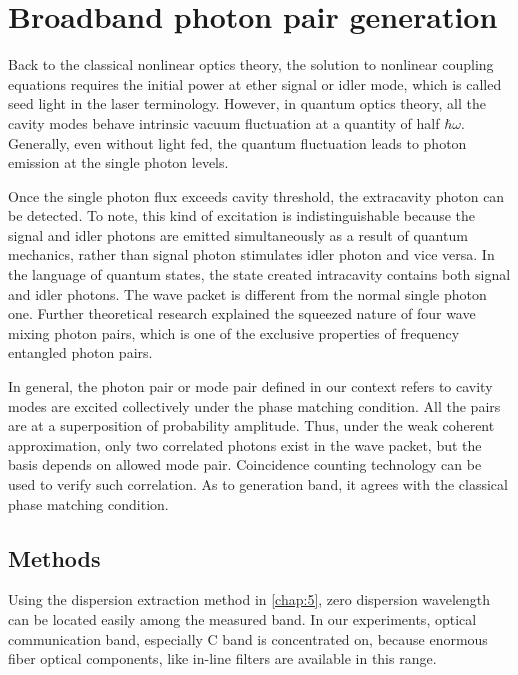 \chapter{Broadband photon pair generation}\label{chap:7}

Back to the classical nonlinear optics theory, the solution to nonlinear coupling equations requires the initial power at ether signal or idler mode, which is called seed light in the laser terminology. However, in quantum optics theory, all the cavity modes behave intrinsic vacuum fluctuation at a quantity of half $ \hbar \omega $. Generally, even without light fed, the quantum fluctuation leads to photon emission at the single photon levels. 

Once the single photon flux exceeds cavity threshold, the extracavity photon can be detected. To note, this kind of excitation is indistinguishable because the signal and idler photons are emitted simultaneously as a result of quantum mechanics, rather than signal photon stimulates idler photon and vice versa. 
In the language of quantum states, the state created intracavity contains both signal and idler photons. The wave packet is different from the normal single photon one. Further theoretical research \cite{Scully1997} explained the squeezed nature of four wave mixing photon pairs, which is one of the exclusive properties of frequency entangled photon pairs.

In general, the photon pair or mode pair defined in our context refers to cavity modes are excited collectively under the phase matching condition. 
All the pairs are at a superposition of probability amplitude.
Thus, under the weak coherent approximation, only two correlated photons exist in the wave packet, but the basis depends on allowed mode pair.
Coincidence counting technology can be used to verify such correlation. As to generation band, it agrees with the classical phase matching condition.

\section{Methods}

Using the dispersion extraction method in \autoref{chap:5}, zero dispersion wavelength can be located easily among the measured band. In our experiments, optical communication band, especially C band is concentrated on, because enormous fiber optical components, like in-line filters are available in this range.

